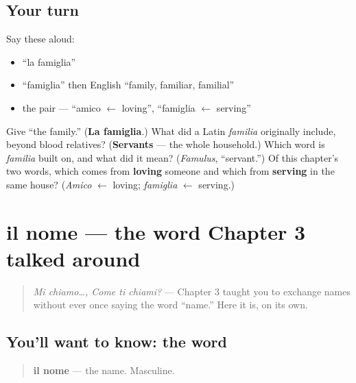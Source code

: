 \subsection*{Your turn}
Say these aloud:

\begin{itemize}
\raggedright
  \item \textquotedblleft{}la famiglia\textquotedblright{}
  \item \textquotedblleft{}famiglia\textquotedblright{} then English \textquotedblleft{}family, familiar, familial\textquotedblright{}
  \item the pair — \textquotedblleft{}amico $\leftarrow$ loving\textquotedblright{}, \textquotedblleft{}famiglia $\leftarrow$ serving\textquotedblright{}
\end{itemize}

\begin{tcolorbox}[breakable,colback=teal!4,colframe=teal!35!black,title={Before you move on}]
Give \textquotedblleft{}the family.\textquotedblright{} (\textbf{La famiglia}.) What did a Latin \emph{familia} originally include, beyond blood relatives? (\textbf{Servants} — the whole household.) Which word is \emph{familia} built on, and what did it mean? (\emph{Famulus}, \textquotedblleft{}servant.\textquotedblright{}) Of this chapter's two words, which comes from \textbf{loving} someone and which from \textbf{serving} in the same house? (\emph{Amico} $\leftarrow$ loving; \emph{famiglia} $\leftarrow$ serving.)
\end{tcolorbox}
\section[il nome]{il nome — the word Chapter 3 talked around}

\label{lesson:IT-C23-nome}



\begin{quote}
\emph{Mi chiamo…, Come ti chiami?} — Chapter 3 taught you to exchange names without ever once saying the word \textquotedblleft{}name.\textquotedblright{} Here it is, on its own.
\end{quote}

\subsection*{You'll want to know: the word}
\begin{quote}
\textbf{il nome} — the name. Masculine.
\end{quote}


